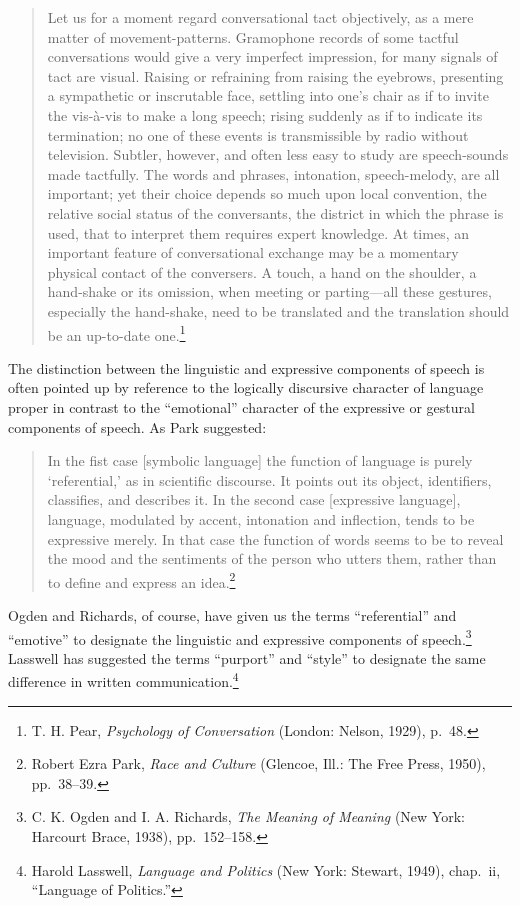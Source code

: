 \documentclass[openany,nobib]{tufte-book}
\begin{document}
\begin{quote}
Let us for a moment regard conversational tact objectively, as a mere
matter of movement-patterns. Gramophone records of some tactful
conversations would give a very imperfect impression, for many signals
of tact are visual. Raising or refraining from raising the eyebrows,
presenting a sympathetic or inscrutable face, settling into one's chair
as if to invite the vis-à-vis to make a long speech; rising suddenly as
if to indicate its termination; no one of these events is transmissible
by radio without television. Subtler, however, and often less easy to
study are speech-sounds made tactfully. The words and phrases,
intonation, speech-melody, are all important; yet their choice depends
so much upon local convention, the relative social status of the
conversants, the district in which the phrase is used, that to interpret
them requires expert knowledge. At times, an important feature of
conversational exchange may be a momentary physical contact of the
conversers. A touch, a hand on the shoulder, a hand-shake or its
omission, when meeting or parting---all these gestures, especially the
hand-shake, need to be translated and the translation should be an
up-to-date one.\footnote{T. H. Pear, \emph{Psychology of Conversation}
  (London: Nelson, 1929), p.~48.}
\end{quote}

\noindent The distinction between the linguistic and expressive components of
speech is often pointed up by reference to the logically discursive
character of language proper in contrast to the ``emotional'' character
of the expressive or gestural components of speech. As Park suggested:

\begin{quote}
In the fist case {[}symbolic language{]} the function of language is
purely `referential,' as in scientific discourse. It points out its
object, identifiers, classifies, and describes it. In the second case
{[}expressive language{]}, language, modulated by accent, intonation and
inflection, tends to be expressive merely. In that case the function of
words seems to be to reveal the mood and the sentiments of the person
who utters them, rather than to define and express an idea.\footnote{Robert
  Ezra Park, \emph{Race and Culture} (Glencoe, Ill.: The Free Press,
  1950), pp.~38--39.}
\end{quote}

\noindent Ogden and Richards, of course, have given us the terms ``referential''
and ``emotive'' to designate the linguistic and expressive components of
speech.\footnote{C. K. Ogden and I. A. Richards, \emph{The Meaning of
  Meaning} (New York: Harcourt Brace, 1938), pp.~152--158.} Lasswell has
suggested the terms ``purport'' and ``style'' to designate the same
difference in written communication.\footnote{Harold Lasswell,
  \emph{Language and Politics} (New York: Stewart, 1949), chap.~ii,
  ``Language of Politics.''}
\end{document}
